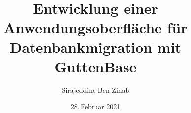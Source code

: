 \makeatletter


\author{Sirajeddine Ben Zinab}

\title{Entwicklung einer Anwendungsoberfläche für Datenbankmigration mit GuttenBase}
\subtitle{}

\date{28.\,Februar 2021}





\onehalfspacing

\makeatother
\endinput
